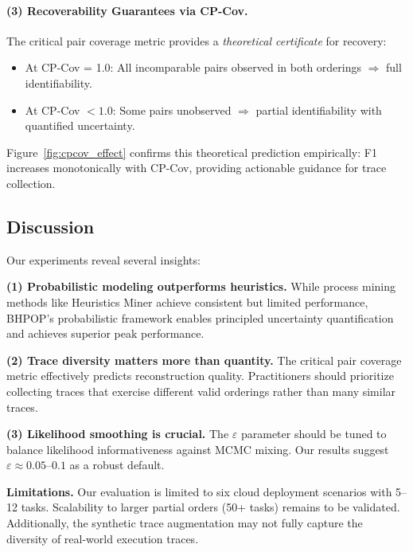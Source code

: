 \paragraph{(3) Recoverability Guarantees via CP-Cov.}
The critical pair coverage metric provides a \emph{theoretical certificate} for recovery:
\begin{itemize}[leftmargin=*,nosep]
    \item At CP-Cov = 1.0: All incomparable pairs observed in both orderings $\Rightarrow$ full identifiability.
    \item At CP-Cov $< 1.0$: Some pairs unobserved $\Rightarrow$ partial identifiability with quantified uncertainty.
\end{itemize}
Figure~\ref{fig:cpcov_effect} confirms this theoretical prediction empirically: F1 increases monotonically with CP-Cov, providing actionable guidance for trace collection.

\subsection{Discussion}

Our experiments reveal several insights:

\textbf{(1) Probabilistic modeling outperforms heuristics.} While process mining methods like Heuristics Miner achieve consistent but limited performance, \textsc{BHPOP}'s probabilistic framework enables principled uncertainty quantification and achieves superior peak performance.

\textbf{(2) Trace diversity matters more than quantity.} The critical pair coverage metric effectively predicts reconstruction quality. Practitioners should prioritize collecting traces that exercise different valid orderings rather than many similar traces.

\textbf{(3) Likelihood smoothing is crucial.} The $\varepsilon$ parameter should be tuned to balance likelihood informativeness against MCMC mixing. Our results suggest $\varepsilon \approx 0.05$--$0.1$ as a robust default.

\textbf{Limitations.} Our evaluation is limited to six cloud deployment scenarios with 5--12 tasks. Scalability to larger partial orders (50+ tasks) remains to be validated. Additionally, the synthetic trace augmentation may not fully capture the diversity of real-world execution traces.


